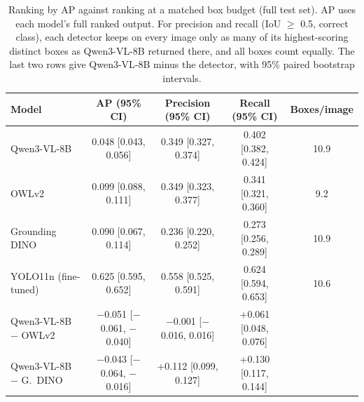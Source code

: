\begin{table}[t]
\centering
\small
\begin{tabular}{lcccc}
\toprule
Model & AP (95\% CI) & Precision (95\% CI) & Recall (95\% CI) & Boxes/image \\
\midrule
Qwen3-VL-8B & 0.048 [0.043, 0.056] & 0.349 [0.327, 0.374] & 0.402 [0.382, 0.424] & 10.9 \\
OWLv2 & 0.099 [0.088, 0.111] & 0.349 [0.323, 0.377] & 0.341 [0.321, 0.360] & 9.2 \\
Grounding DINO & 0.090 [0.067, 0.114] & 0.236 [0.220, 0.252] & 0.273 [0.256, 0.289] & 10.9 \\
YOLO11n (fine-tuned) & 0.625 [0.595, 0.652] & 0.558 [0.525, 0.591] & 0.624 [0.594, 0.653] & 10.6 \\
\midrule
Qwen3-VL-8B $-$ OWLv2 & $-$0.051 [$-$0.061, $-$0.040] & $-$0.001 [$-$0.016, 0.016] & +0.061 [0.048, 0.076] & \\
Qwen3-VL-8B $-$ G.\ DINO & $-$0.043 [$-$0.064, $-$0.016] & +0.112 [0.099, 0.127] & +0.130 [0.117, 0.144] & \\
\bottomrule
\end{tabular}
\caption{Ranking by AP against ranking at a matched box budget (full test set). AP uses each model's full ranked output. For precision and recall (IoU $\geq$ 0.5, correct class), each detector keeps on every image only as many of its highest-scoring distinct boxes as Qwen3-VL-8B returned there, and all boxes count equally. The last two rows give Qwen3-VL-8B minus the detector, with 95\% paired bootstrap intervals.}
\label{tab:budget}
\end{table}
